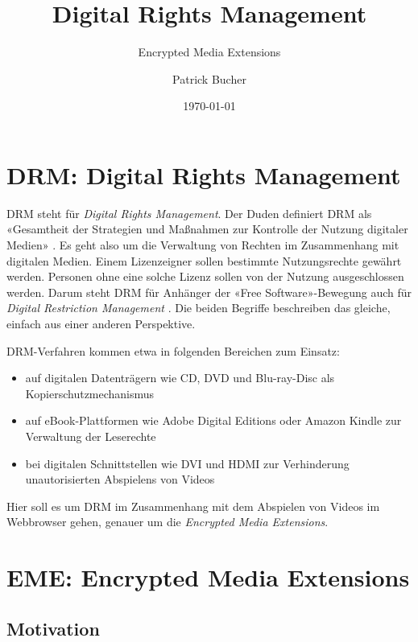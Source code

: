\documentclass[a4paper,11pt]{scrartcl}
\begin{document}
\title{Digital Rights Management}
\subtitle{Encrypted Media Extensions}
\author{Patrick Bucher}
\date{\today}
\maketitle

\tableofcontents

\section{DRM: Digital Rights Management}

DRM steht für \textit{Digital Rights Management}. Der Duden definiert DRM als «Gesamtheit der Strategien und Maßnahmen zur Kontrolle der Nutzung digitaler Medien» \cite{duden}. Es geht also um die Verwaltung von Rechten im Zusammenhang mit digitalen Medien. Einem Lizenzeigner sollen bestimmte Nutzungsrechte gewährt werden. Personen ohne eine solche Lizenz sollen von der Nutzung ausgeschlossen werden. Darum steht DRM für Anhänger der «Free Software»-Bewegung auch für \textit{Digital Restriction Management} \cite{defectivebydesign}. Die beiden Begriffe beschreiben das gleiche, einfach aus einer anderen Perspektive.

DRM-Verfahren kommen etwa in folgenden Bereichen zum Einsatz:

\begin{itemize}
    \item{auf digitalen Datenträgern wie CD, DVD und Blu-ray-Disc als Kopierschutzmechanismus}
    \item{auf eBook-Plattformen wie Adobe Digital Editions oder Amazon Kindle zur Verwaltung der Leserechte}
    \item{bei digitalen Schnittstellen wie DVI und HDMI zur Verhinderung unautorisierten Abspielens von Videos}
\end{itemize}

Hier soll es um DRM im Zusammenhang mit dem Abspielen von Videos im Webbrowser gehen, genauer um die \textit{Encrypted Media Extensions}.

\section{EME: Encrypted Media Extensions}

\subsection{Motivation}
\end{document}
